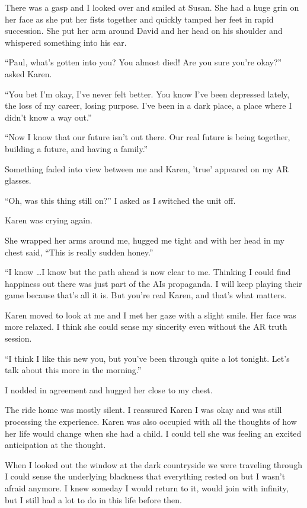 There was a gasp and I looked over and smiled at Susan.  She had
a huge grin on her face as she put her fists together and
quickly tamped her feet in rapid succession. She put her arm
around David and her head on his shoulder and whispered
something into his ear.

``Paul, what's gotten into you? You almost died!  Are you sure
you're okay?'' asked Karen.

``You bet I'm okay, I've never felt better. You know I've been
depressed lately, the loss of my career, losing purpose.  I've
been in a dark place, a place where I didn't know a way out.''

``Now I know that our future isn't out there. Our real future is
being together, building a future, and having a family.''

Something faded into view between me and Karen, 'true'
appeared on my AR glasses.

``Oh, was this thing still on?'' I asked as I switched the unit
off.

Karen was crying again.

She wrapped her arms around me, hugged me tight and with her
head in my chest said, ``This is really sudden honey.''

``I know \ldots I know but the path ahead is now clear to me. Thinking I
could find happiness out there was just part of the AIs
propaganda. I will keep playing their game because that's all it
is. But you're real Karen, and that's what matters.

Karen moved to look at me and I met her gaze with a slight smile.
Her face was more relaxed. I
think she could sense my sincerity even without the AR truth
session.

``I think I like this new you, but you've been through quite a
lot tonight.  Let's talk about this more in the morning.''

I nodded in agreement and hugged her close to my chest.

The ride home was mostly silent. I reassured Karen I was okay
and was still processing the experience. Karen was also occupied
with all the thoughts of how her life would change when she had
a child. I could tell she was feeling an excited anticipation at
the thought.

When I looked out the window at the dark countryside we were
traveling through I could sense the underlying blackness that
everything rested on but I wasn't afraid anymore. I knew someday
I would return to it, would join with infinity, but I still had a lot
to do in this life before then.

